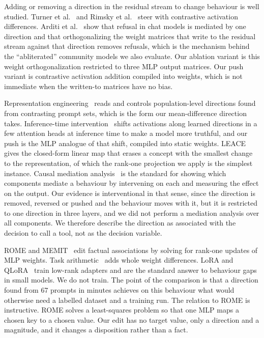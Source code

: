 \documentclass[11pt]{article}
\begin{document}
Adding or removing a direction in the residual stream to change behaviour is well studied. Turner et al.~\citep{turner2023steering} and Rimsky et al.~\citep{panickssery2024caa} steer with contrastive activation differences. Arditi et al.~\citep{arditi2024refusal} show that refusal in chat models is mediated by one direction and that orthogonalizing the weight matrices that write to the residual stream against that direction removes refusals, which is the mechanism behind the ``abliterated'' community models we also evaluate. Our ablation variant is this weight orthogonalization restricted to three MLP output matrices. Our push variant is contrastive activation addition compiled into weights, which is not immediate when the written-to matrices have no bias.

Representation engineering~\citep{zou2023repe} reads and controls population-level directions found from contrasting prompt sets, which is the form our mean-difference direction takes. Inference-time intervention~\citep{li2023iti} shifts activations along learned directions in a few attention heads at inference time to make a model more truthful, and our push is the MLP analogue of that shift, compiled into static weights. LEACE~\citep{belrose2023leace} gives the closed-form linear map that erases a concept with the smallest change to the representation, of which the rank-one projection we apply is the simplest instance. Causal mediation analysis~\citep{vig2020causal} is the standard for showing which components mediate a behaviour by intervening on each and measuring the effect on the output. Our evidence is interventional in that sense, since the direction is removed, reversed or pushed and the behaviour moves with it, but it is restricted to one direction in three layers, and we did not perform a mediation analysis over all components. We therefore describe the direction as associated with the decision to call a tool, not as the decision variable.

ROME and MEMIT~\citep{meng2022rome,meng2023memit} edit factual associations by solving for rank-one updates of MLP weights. Task arithmetic~\citep{ilharco2023taskvectors} adds whole weight differences. LoRA and QLoRA~\citep{hu2022lora,dettmers2023qlora} train low-rank adapters and are the standard answer to behaviour gaps in small models. We do not train. The point of the comparison is that a direction found from 67 prompts in minutes achieves on this behaviour what would otherwise need a labelled dataset and a training run. The relation to ROME is instructive. ROME solves a least-squares problem so that one MLP maps a chosen key to a chosen value. Our edit has no target value, only a direction and a magnitude, and it changes a disposition rather than a fact.
\end{document}

